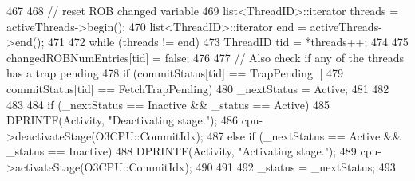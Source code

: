 \begin{DoxyCode}
467 {
468     // reset ROB changed variable
469     list<ThreadID>::iterator threads = activeThreads->begin();
470     list<ThreadID>::iterator end = activeThreads->end();
471 
472     while (threads != end) {
473         ThreadID tid = *threads++;
474 
475         changedROBNumEntries[tid] = false;
476 
477         // Also check if any of the threads has a trap pending
478         if (commitStatus[tid] == TrapPending ||
479             commitStatus[tid] == FetchTrapPending) {
480             _nextStatus = Active;
481         }
482     }
483 
484     if (_nextStatus == Inactive && _status == Active) {
485         DPRINTF(Activity, "Deactivating stage.\n");
486         cpu->deactivateStage(O3CPU::CommitIdx);
487     } else if (_nextStatus == Active && _status == Inactive) {
488         DPRINTF(Activity, "Activating stage.\n");
489         cpu->activateStage(O3CPU::CommitIdx);
490     }
491 
492     _status = _nextStatus;
493 }
\end{DoxyCode}



